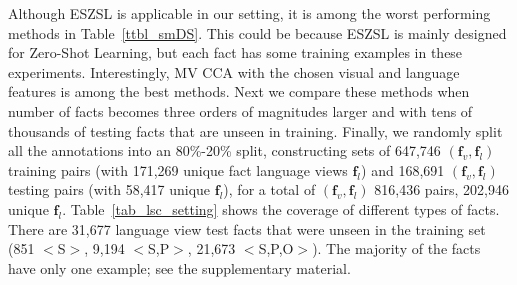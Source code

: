 \documentclass[runningheads]{llncs}
\begin{document}
Although ESZSL is applicable in our setting, it is among the worst performing methods in Table~\ref{ttbl_smDS}.
This could be because ESZSL is mainly designed for Zero-Shot Learning, but each fact has some training examples in these experiments. Interestingly, MV CCA with the chosen visual and language features is among the best methods.  Next we compare these methods when number of facts becomes three orders of magnitudes larger and with tens of thousands of testing facts that are unseen in training.%
Finally, we randomly split all the annotations into an 80\%-20\% split, constructing sets of 647,746 $(\mathbf{f}_v, \mathbf{f}_l)$ training pairs (with 171,269 unique fact language views $\mathbf{f}_l$) and 168,691 $(\mathbf{f}_v, \mathbf{f}_l)$ testing pairs (with 58,417 unique $\mathbf{f}_l$), for a total of $(\mathbf{f}_v, \mathbf{f}_l)$ 816,436 pairs, 202,946 unique  $\mathbf{f}_l$. Table~\ref{tab_lsc_setting} shows the coverage of  different types of facts. %
There are 31,677 language view test facts  that were unseen in the training set (851 $<$S$>$, 9,194 $<$S,P$>$, 21,673 $<$S,P,O$>$).
The majority of the facts have only one example; see the supplementary material.
\end{document}
